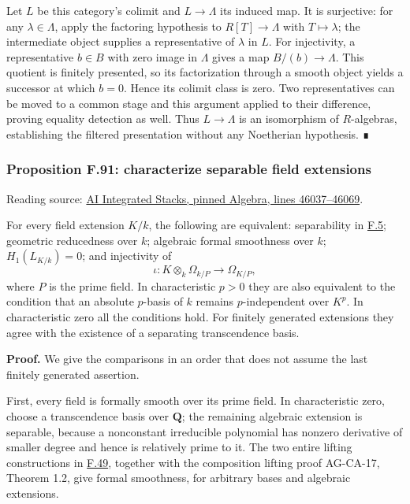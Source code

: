 \documentclass[11pt,a4paper,openany]{report}
\begin{document}
Let \(L\) be this category's colimit and \(L\to\Lambda\) its induced map. It is surjective: for any \(\lambda\in\Lambda\), apply the factoring hypothesis to \(R[T]\to\Lambda\) with \(T\mapsto\lambda\); the intermediate object supplies a representative of \(\lambda\) in \(L\). For injectivity, a representative \(b\in B\) with zero image in \(\Lambda\) gives a map \(B/(b)\to\Lambda\). This quotient is finitely presented, so its factorization through a smooth object yields a successor at which \(b=0\). Hence its colimit class is zero. Two representatives can be moved to a common stage and this argument applied to their difference, proving equality detection as well. Thus \(L\to\Lambda\) is an isomorphism of \(R\)-algebras, establishing the filtered presentation without any Noetherian hypothesis. ∎

\label{AG-RG-S05-algebra-proposition-characterize-separable-field-extensions}

\subsubsection{Proposition F.91: characterize separable field extensions}\label{AG-RG-S05-proposition-f.91-characterize-separable-field-extensions}

Reading source: \href{https://github.com/KokunoYumeto/unofficial-stacks-project-ai-drafts/blob/565b10e987aba5969b21145a0833f42d69f96790/algebra.tex\#L46037-L46069}{AI Integrated Stacks, pinned Algebra, lines 46037--46069}.

For every field extension \(K/k\), the following are equivalent: separability in \hyperref[AG-RG-S05-algebra-definition-separable-field-extension]{F.5}; geometric reducedness over \(k\); algebraic formal smoothness over \(k\); \(H_1(L_{K/k})=0\); and injectivity of \[\iota:K\otimes_k\Omega_{k/P}\longrightarrow\Omega_{K/P},\] where \(P\) is the prime field. In characteristic \(p>0\) they are also equivalent to the condition that an absolute \(p\)-basis of \(k\) remains \(p\)-independent over \(K^p\). In characteristic zero all the conditions hold. For finitely generated extensions they agree with the existence of a separating transcendence basis.

\textbf{Proof.} We give the comparisons in an order that does not assume the last finitely generated assertion.

First, every field is formally smooth over its prime field. In characteristic zero, choose a transcendence basis over \(\mathbf Q\); the remaining algebraic extension is separable, because a nonconstant irreducible polynomial has nonzero derivative of smaller degree and hence is relatively prime to it. The two entire lifting constructions in \hyperref[AG-RG-S05-algebra-lemma-formally-smooth-extensions-easy]{F.49}, together with the composition lifting proof AG-CA-17, Theorem 1.2, give formal smoothness, for arbitrary bases and algebraic extensions.
\end{document}

